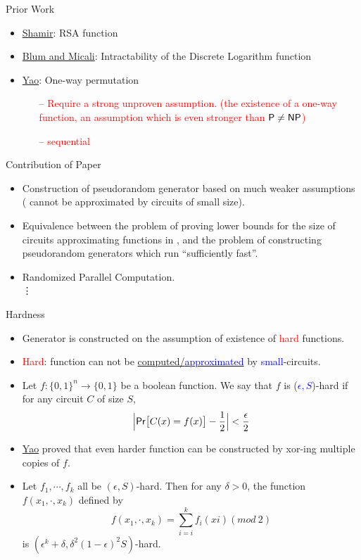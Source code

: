 \documentclass[xcolor={table,dvipsnames,usenames}]{beamer}
\begin{document}
\begin{frame}{Prior Work}
\begin{itemize}
	\item \href{https://link.springer.com/chapter/10.1007/3-540-10843-2_43}{Shamir}: RSA function
	\item  \href{https://dl.acm.org/citation.cfm?id=2068}{Blum and Micali}: Intractability of the Discrete Logarithm function
	\item \href{https://ieeexplore.ieee.org/document/4568378}{Yao}: One-way permutation
	\pause
	\begin{itemize}
		\item[--] \textcolor{red}{Require a strong unproven assumption. (the existence of a one-way function, an assumption which is even stronger than $ \mathsf{P} \neq \mathsf{NP}$)}
		\item[--] \textcolor{red}{sequential}
	\end{itemize}
\end{itemize}
\end{frame}
\begin{frame}{Contribution of Paper}
\begin{itemize}
	\item Construction of pseudorandom generator based on much weaker assumptions ({\EXPTIME} cannot be approximated by circuits of small size).
	\item Equivalence between the problem of proving lower bounds for the size of circuits approximating functions in {\EXPTIME}, and the problem of constructing pseudorandom generators which run ``sufficiently fast''.
	\item Randomized Parallel Computation.\\
	\quad \quad \vdots
\end{itemize}
\end{frame}
\begin{frame}{Hardness}
\begin{itemize}
	\item Generator is constructed on the assumption of existence of \textcolor{red}{hard} functions.
	\pause
	\item \textcolor{red}{Hard}: function can not be \underline{computed/\textcolor{blue}{approximated}} by \textcolor{blue}{small}-circuits.
	\pause
	\item  Let $f:\{0,1\}^n \rightarrow \{0, 1\}$ be a boolean function. We say that $f$ is (\textcolor{blue}{$\epsilon,S$})-hard if for any circuit $C$ of size $S$,
	$$\Big|\mathsf{Pr}\big[C(x)=f(x)\big]- \frac{1}{2}\Big| < \frac{\epsilon}{2}$$
	\pause
	\item \href{https://ieeexplore.ieee.org/document/4568378/}{Yao} proved that even harder function can be constructed by xor-ing multiple copies of $f$.
	\pause
	\item Let $f_1, \cdots, f_k$ all be $(\epsilon,S)$-hard. Then for any $\delta>0$, the function $f(x_1, \cdot, x_k)$ defined by
	$$f(x_1, \cdot, x_k)= \sum_{i = i}^{k} f_i(xi) (mod~2)$$
	is  $(\epsilon^k + \delta, \delta^2(1-\epsilon)^2S)$-hard.
\end{itemize}
\end{frame}
\end{document}
